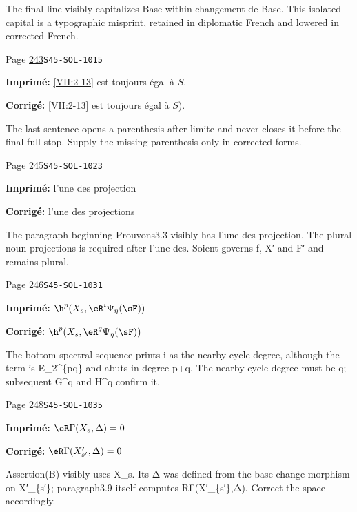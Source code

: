 \begin{description}
\par\noindent The final line visibly capitalizes Base within changement de Base. This isolated capital is a typographic misprint, retained in diplomatic French and lowered in corrected French.
\smallskip
\item[\hypertarget{apparatus:FR-0254}{254}] Page \hyperlink{printpage:fr:243}{243}\quad\texttt{S45-SOL-1015}
\par\noindent\textbf{Imprimé:} \ref{VII:2-13} est toujours égal à $S$.
\par\noindent\textbf{Corrigé:} \ref{VII:2-13} est toujours égal à $S$).
\par\noindent The last sentence opens a parenthesis after limite and never closes it before the final full stop. Supply the missing parenthesis only in corrected forms.
\smallskip
\item[\hypertarget{apparatus:FR-0255}{255}] Page \hyperlink{printpage:fr:245}{245}\quad\texttt{S45-SOL-1023}
\par\noindent\textbf{Imprimé:} l'une des projection 
\par\noindent\textbf{Corrigé:} l'une des projections 
\par\noindent The paragraph beginning Prouvons3.3 visibly has l’une des projection. The plural noun projections is required after l’une des. Soient governs f, X′ and F′ and remains plural.
\smallskip
\item[\hypertarget{apparatus:FR-0256}{256}] Page \hyperlink{printpage:fr:246}{246}\quad\texttt{S45-SOL-1031}
\par\noindent\textbf{Imprimé:} \(\h^p(X_s,\eR^i\Psi_\eta(\sF))\)
\par\noindent\textbf{Corrigé:} \(\h^p(X_s,\eR^q\Psi_\eta(\sF))\)
\par\noindent The bottom spectral sequence prints i as the nearby-cycle degree, although the term is E\_2\textasciicircum{}\{pq\} and abuts in degree p+q. The nearby-cycle degree must be q; subsequent G\textasciicircum{}q and H\textasciicircum{}q confirm it.
\smallskip
\item[\hypertarget{apparatus:FR-0257}{257}] Page \hyperlink{printpage:fr:248}{248}\quad\texttt{S45-SOL-1035}
\par\noindent\textbf{Imprimé:} $\eR\Gamma(X_s,\Delta)=0$
\par\noindent\textbf{Corrigé:} $\eR\Gamma(X_{s'}',\Delta)=0$
\par\noindent Assertion(B) visibly uses X\_s. Its Δ was defined from the base-change morphism on X′\_\{s′\}; paragraph3.9 itself computes RΓ(X′\_\{s′\},Δ). Correct the space accordingly.

\end{description}
